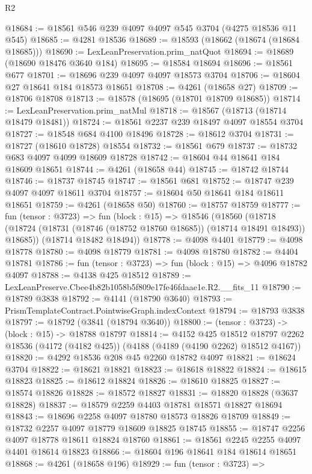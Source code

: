 \begin{lexlean}{R2}
\begin{coremodule}
@18684 := @18561 @546 @239 @4097 @4097 @545 @3704 (@4275 @18536 @11 @545)
@18685 := @4281 @18536
@18689 := @18593 (@18662 (@18674 (@18684 @18685)))
@18690 := LexLeanPreservation.prim_natQuot
@18694 := @18689 (@18690 @18476 @3640 @184)
@18695 := @18584 @18694
@18696 := @18561 @677
@18701 := @18696 @239 @4097 @4097 @18573 @3704
@18706 := @18604 @27 @18641 @184 @18573 @18651
@18708 := @4261 (@18658 @27)
@18709 := @18706 @18708
@18713 := @18578 (@18695 (@18701 @18709 @18685))
@18714 := LexLeanPreservation.prim_natMul
@18718 := @18567 (@18713 (@18714 @18479 @18481))
@18724 := @18561 @2237 @239 @18497 @4097 @18554 @3704
@18727 := @18548 @684 @4100 @18496
@18728 := @18612 @3704
@18731 := @18727 (@18610 @18728) @18554
@18732 := @18561 @679
@18737 := @18732 @683 @4097 @4099 @18609 @18728
@18742 := @18604 @44 @18641 @184 @18609 @18651
@18744 := @4261 (@18658 @44)
@18745 := @18742 @18744
@18746 := @18737 @18745
@18747 := @18561 @681
@18752 := @18747 @239 @4097 @4097 @18611 @3704
@18757 := @18604 @50 @18641 @184 @18611 @18651
@18759 := @4261 (@18658 @50)
@18760 := @18757 @18759
@18777 := fun (tensor : @3723) =>
  fun (block : @15) =>
  @18546
    (@18560
      (@18718 (@18724 (@18731 (@18746 (@18752 @18760 @18685)) (@18714 @18491 @18493)) @18685))
      (@18714 @18482 @18494))
@18778 := @4098 @4401
@18779 := @4098 @18778
@18780 := @4098 @18779
@18781 := @4098 @18780
@18782 := @4404 @18781
@18786 := fun (tensor : @3723) => fun (block : @15) => @4096 @18782 @4097
@18788 := @4138 @425 @18512
@18789 := LexLeanPreserve.Cbee4b82b1058b5f809e17fe46fdaae1e.R2.__fits_11
@18790 := @18789 @3838
@18792 := @4141 (@18790 @3640)
@18793 := PrismTemplateContract.PointwiseGraph.indexContext
@18794 := @18793 @3838
@18797 := @18792 (@3841 (@18794 @3640))
@18800 := (tensor : @3723) -> (block : @15) -> @18788 @18797
@18814 := @4152
    @425
    @18512
    @18797
    @2262
    @18536
    (@4172 (@4182 @425))
    (@4188 (@4189 (@4190 @2262) @18512 @4167))
@18820 := @4292 @18536 @208 @45 @2260 @18782 @4097
@18821 := @18624 @3704
@18822 := @18621 @18821
@18823 := @18618 @18822
@18824 := @18615 @18823
@18825 := @18612 @18824
@18826 := @18610 @18825
@18827 := @18574 @18826
@18828 := @18572 @18827
@18831 := @18820 @18828 (@3637 @18828)
@18837 := @18579 @2259 @4403 @18781 @18571 @18827 @18694
@18843 := @18696 @2258 @4097 @18780 @18573 @18826 @18709
@18849 := @18732 @2257 @4097 @18779 @18609 @18825 @18745
@18855 := @18747 @2256 @4097 @18778 @18611 @18824 @18760
@18861 := @18561 @2245 @2255 @4097 @4401 @18614 @18823
@18866 := @18604 @196 @18641 @184 @18614 @18651
@18868 := @4261 (@18658 @196)
@18929 := fun (tensor : @3723) =>

\end{coremodule}
\end{lexlean}
